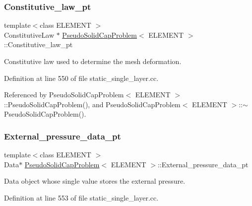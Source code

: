 \subsubsection{\texorpdfstring{Constitutive\+\_\+law\+\_\+pt}{Constitutive\_law\_pt}}
{\footnotesize\ttfamily template$<$class E\+L\+E\+M\+E\+NT $>$ \\
Constitutive\+Law $\ast$ \hyperlink{classPseudoSolidCapProblem}{Pseudo\+Solid\+Cap\+Problem}$<$ E\+L\+E\+M\+E\+NT $>$\+::Constitutive\+\_\+law\+\_\+pt\hspace{0.3cm}{\ttfamily [private]}}



Constitutive law used to determine the mesh deformation. 



Definition at line 550 of file static\+\_\+single\+\_\+layer.\+cc.



Referenced by Pseudo\+Solid\+Cap\+Problem$<$ E\+L\+E\+M\+E\+N\+T $>$\+::\+Pseudo\+Solid\+Cap\+Problem(), and Pseudo\+Solid\+Cap\+Problem$<$ E\+L\+E\+M\+E\+N\+T $>$\+::$\sim$\+Pseudo\+Solid\+Cap\+Problem().

\mbox{\label{classPseudoSolidCapProblem_a51ac066b9117f30679fef658ff66d981}} 
\subsubsection{\texorpdfstring{External\+\_\+pressure\+\_\+data\+\_\+pt}{External\_pressure\_data\_pt}}
{\footnotesize\ttfamily template$<$class E\+L\+E\+M\+E\+NT $>$ \\
Data$\ast$ \hyperlink{classPseudoSolidCapProblem}{Pseudo\+Solid\+Cap\+Problem}$<$ E\+L\+E\+M\+E\+NT $>$\+::External\+\_\+pressure\+\_\+data\+\_\+pt\hspace{0.3cm}{\ttfamily [private]}}



Data object whose single value stores the external pressure. 



Definition at line 553 of file static\+\_\+single\+\_\+layer.\+cc.



